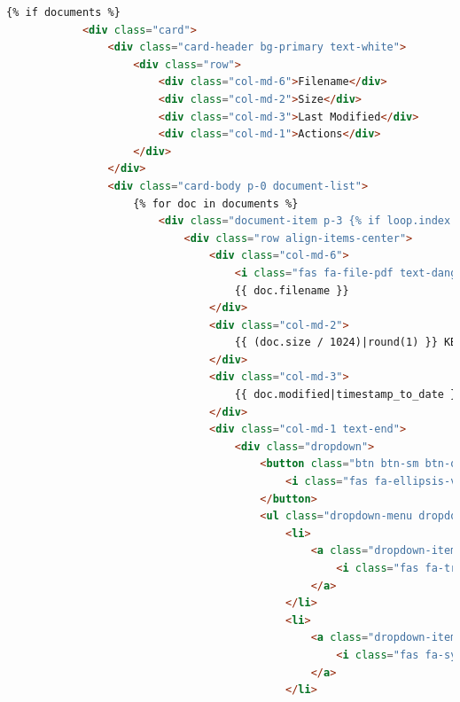 \documentclass[
  screen,review,acmlarge]{acmart}
\begin{document}
\begin{lstlisting}[language=HTML]
        {% if documents %}
            <div class="card">
                <div class="card-header bg-primary text-white">
                    <div class="row">
                        <div class="col-md-6">Filename</div>
                        <div class="col-md-2">Size</div>
                        <div class="col-md-3">Last Modified</div>
                        <div class="col-md-1">Actions</div>
                    </div>
                </div>
                <div class="card-body p-0 document-list">
                    {% for doc in documents %}
                        <div class="document-item p-3 {% if loop.index % 2 == 0 %}bg-light{% endif %}">
                            <div class="row align-items-center">
                                <div class="col-md-6">
                                    <i class="fas fa-file-pdf text-danger me-2"></i>
                                    {{ doc.filename }}
                                </div>
                                <div class="col-md-2">
                                    {{ (doc.size / 1024)|round(1) }} KB
                                </div>
                                <div class="col-md-3">
                                    {{ doc.modified|timestamp_to_date }}
                                </div>
                                <div class="col-md-1 text-end">
                                    <div class="dropdown">
                                        <button class="btn btn-sm btn-outline-secondary dropdown-toggle" type="button" data-bs-toggle="dropdown">
                                            <i class="fas fa-ellipsis-v"></i>
                                        </button>
                                        <ul class="dropdown-menu dropdown-menu-end">
                                            <li>
                                                <a class="dropdown-item" href="#" onclick="event.preventDefault(); deleteDocument('{{ doc.filename }}')">
                                                    <i class="fas fa-trash text-danger me-2"></i> Delete
                                                </a>
                                            </li>
                                            <li>
                                                <a class="dropdown-item" href="#" onclick="event.preventDefault(); reindexDocument('{{ doc.filename }}')">
                                                    <i class="fas fa-sync text-primary me-2"></i> Reindex
                                                </a>
                                            </li>

\end{lstlisting}
\end{document}
